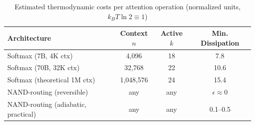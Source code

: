 \begin{table}[h]






\centering






\caption{Estimated thermodynamic costs per attention operation (normalized units, $k_B T \ln 2 \equiv 1$)}






\label{tab:thermo-scaling}






\begin{tabular}{lccc}






\toprule






\textbf{Architecture} & \textbf{Context $n$} & \textbf{Active $k$} & \textbf{Min. Dissipation} \\






\midrule






Softmax (7B, 4K ctx) & 4,096 & 18 & 7.8 \\






Softmax (70B, 32K ctx) & 32,768 & 22 & 10.6 \\






Softmax (theoretical 1M ctx) & 1,048,576 & 24 & 15.4 \\






\midrule






NAND-routing (reversible) & any & any & $\epsilon \approx 0$ \\






NAND-routing (adiabatic, practical) & any & any & 0.1--0.5 \\






\bottomrule






\end{tabular}






\end{table}













